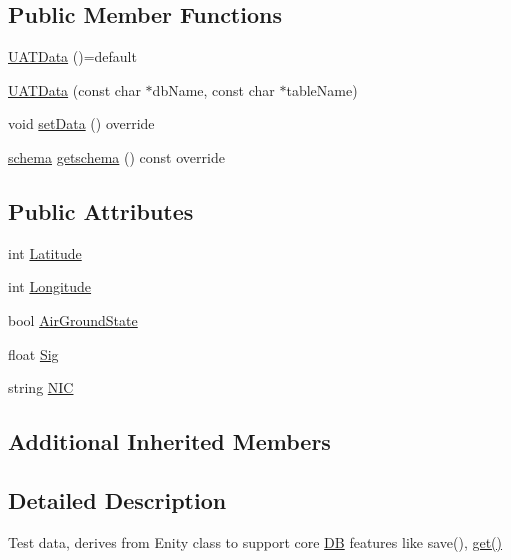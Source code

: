 \subsection*{Public Member Functions}
\begin{DoxyCompactItemize}
\item 
\mbox{\hyperlink{classUATData_a513b470878475946eca85bcb29810351}{U\+A\+T\+Data}} ()=default
\item 
\mbox{\hyperlink{classUATData_a5b4692dc1d8e0ad1a08358a4df27dc9d}{U\+A\+T\+Data}} (const char $\ast$db\+Name, const char $\ast$table\+Name)
\item 
void \mbox{\hyperlink{classUATData_a969aa1661ec27cd3b85999fc61403a0e}{set\+Data}} () override
\item 
\mbox{\hyperlink{datadefinition_8h_aec40b8d2d2c045d8af617ce94864651f}{schema}} \mbox{\hyperlink{classUATData_a33290ef354a04c15d5262ccc7500411b}{getschema}} () const override
\end{DoxyCompactItemize}
\subsection*{Public Attributes}
\begin{DoxyCompactItemize}
\item 
int \mbox{\hyperlink{classUATData_afa9b129b79280003eb7089447d77bf6d}{Latitude}}
\item 
int \mbox{\hyperlink{classUATData_a68f21f5af40cb1412ed4bc69a3e82305}{Longitude}}
\item 
bool \mbox{\hyperlink{classUATData_a8c2ca1eae7147dfdc99d2ea5b83a1763}{Air\+Ground\+State}}
\item 
float \mbox{\hyperlink{classUATData_a62c8c4089c4dc59347fca7cc569332b5}{Sig}}
\item 
string \mbox{\hyperlink{classUATData_ada1643b5e42b79e4a27bbf6d20505ef9}{N\+IC}}
\end{DoxyCompactItemize}
\subsection*{Additional Inherited Members}


\subsection{Detailed Description}
Test data, derives from Enity class to support core \mbox{\hyperlink{classDB}{DB}} features like save(), \mbox{\hyperlink{classColumns_a4467704e26d0899a5873df4a28978cd2}{get()}} 

